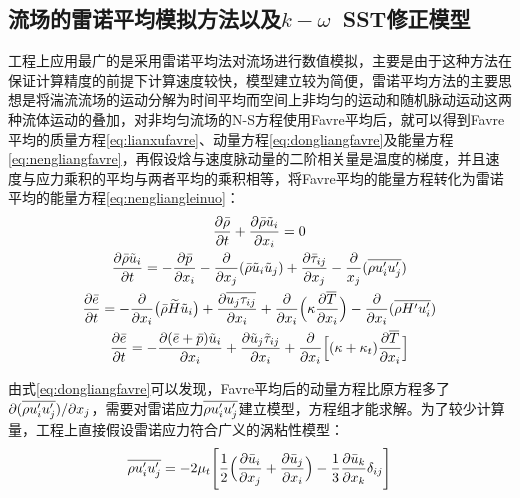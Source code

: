 \subsection{流场的雷诺平均模拟方法以及$k-\omega$~SST修正模型} 
工程上应用最广的是采用雷诺平均法对流场进行数值模拟，主要是由于这种方法在保证计算精度的前提下计算速度较快，模型建立较为简便，雷诺平均方法的主要思想是将湍流流场的运动分解为时间平均而空间上非均匀的运动和随机脉动运动这两种流体运动的叠加，对非均匀流场的N-S方程使用Favre平均后\cite{zhao2010}，就可以得到Favre平均的质量方程\eqref{eq:lianxufavre}、动量方程\eqref{eq:dongliangfavre}及能量方程\eqref{eq:nengliangfavre}，再假设焓与速度脉动量的二阶相关量是温度的梯度，并且速度与应力乘积的平均与两者平均的乘积相等，将Favre平均的能量方程转化为雷诺平均的能量方程\eqref{eq:nengliangleinuo}：
\begin{gather}
\frac{\partial\bar{\rho}}{\partial t}+\frac{\partial\bar{\rho}\tilde{u}_i}{\partial x_i}=0\label{eq:lianxufavre}\\
\frac{\partial\bar{\rho}\tilde{u}_i}{\partial t}=-\frac{\partial \bar{p}}{\partial x_i}-\frac{\partial}{\partial x_j}(\bar{\rho}\tilde{u}_i\tilde{u}_j)+\frac{\partial \bar{\tau}_{ij}}{\partial x_j}-\frac{\partial}{x_j}(\overline{\rho u_i'u_j'\vphantom{1}})\label{eq:dongliangfavre}\\
\frac{\partial\bar{e}}{\partial t}=-\frac{\partial}{\partial x_i}\bigl(\bar{\rho}\widetilde{H}\tilde{u}_i\bigr)+\frac{\partial\overline{u_j\tau_{ij}\vphantom{0}}}{\partial x_i}+\frac{\partial}{\partial x_i}\Bigl(\kappa\frac{\partial\overline{T}}{\partial x_i}\Bigr)-\frac{\partial}{\partial x_i}(\overline{\rho H'u_i'})
\label{eq:nengliangfavre}\\
\frac{\partial\bar{e}}{\partial t}=-\frac{\partial(\bar{e}+\bar{p})\tilde{u}_i}{\partial x_i}+\frac{\partial\tilde{u}_j\tilde{\tau}_{ij}}{\partial x_i}+\frac{\partial}{\partial x_i}\Bigl[(\kappa+\kappa_t)\frac{\partial \overline{T}}{\partial x_i}\Bigr]\label{eq:nengliangleinuo}
\end{gather}

由式\eqref{eq:dongliangfavre}可以发现，Favre平均后的动量方程比原方程多了$\partial(\overline{\rho u_i'u_j'\vphantom{1}})/\partial x_j$，需要对雷诺应力$\overline{\rho u_i'u_j'\vphantom{1}}$建立模型，方程组才能求解。为了较少计算量，工程上直接假设雷诺应力符合广义的涡粘性模型：
\begin{equation}
\overline{\rho u_i'u_j'\vphantom{1}}=-2\mu_t\Bigg[\frac{1}{2}\Big(\frac{\partial \bar{u}_i}{\partial x_j}+\frac{\partial\bar{u}_j}{\partial x_i}\Big)-\frac{1}{3}\frac{\partial\bar{u}_k}{\partial x_k}\delta_{ij}\Bigg]
\label{eq:leinuoyingli}
\end{equation}

